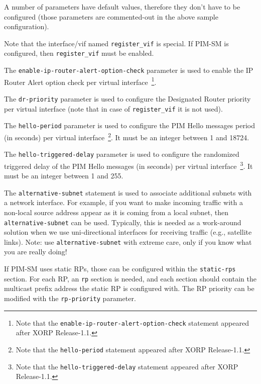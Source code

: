 \vspace{0.1in}

A number of parameters have default values, therefore
they don't have to be configured (those parameters are commented-out
in the above sample configuration).

Note that the interface/vif named {\tt register\_vif} is special.
If PIM-SM is configured, then {\tt register\_vif} must be enabled.

The {\tt enable-ip-router-alert-option-check} parameter is used to
enable the IP Router Alert option check per virtual interface~\footnote{Note
that the {\tt enable-ip-router-alert-option-check} statement appeared after
XORP Release-1.1.}.

The {\tt dr-priority} parameter is used to configure the Designated Router
priority per virtual interface (note that in case of {\tt register\_vif}
it is not used).

The {\tt hello-period} parameter is used to configure the PIM Hello
messages period (in seconds) per virtual interface~\footnote{Note that the
{\tt hello-period} statement appeared after XORP Release-1.1.}. It must
be an integer between 1 and 18724.

The {\tt hello-triggered-delay} parameter is used to configure the
randomized triggered delay of the PIM Hello messages (in
seconds) per virtual interface~\footnote{Note that the
{\tt hello-triggered-delay} statement appeared after XORP
Release-1.1.}. It must be an integer between 1 and 255.

The {\tt alternative-subnet} statement is used to associate additional
subnets with a network interface. For example, if you want to make
incoming traffic with a non-local source address appear as it is
coming from a local subnet, then {\tt alternative-subnet} can be
used. Typically, this is needed as a work-around solution when we use
uni-directional interfaces for receiving traffic (e.g., satellite
links).  Note: use {\tt alternative-subnet} with extreme care, only if
you know what you are really doing!

If PIM-SM uses static RPs, those can be configured within the
{\tt static-rps} section. For each RP, an {\tt rp} section is needed, and each
section should contain the multicast prefix address the static RP is
configured with. The RP priority can be modified with the {\tt rp-priority}
parameter.

